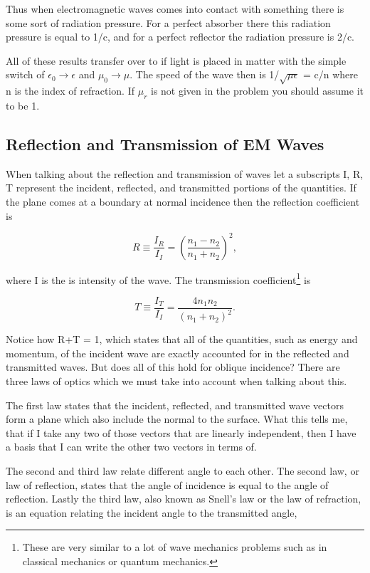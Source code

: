 \documentclass[preprint, review,12pt]{elsarticle}
\def\={\equiv}
\def\9{\left(}
\def\0{\right)}
\begin{document}
Thus when electromagnetic waves comes into contact with something there is some sort of radiation pressure. For a perfect absorber there this radiation pressure is equal to 1/c, and for a perfect reflector the radiation pressure is 2/c.

All of these results transfer over to if light is placed in matter with the simple switch of $\epsilon_0 \rightarrow \epsilon$ and $\mu_0 \rightarrow \mu.$ The speed of the wave then is 1/$\sqrt{\mu \epsilon}$ = c/n where n is the index of refraction. If $\mu_r$ is not given in the problem you should assume it to be 1.

\subsection{Reflection and Transmission of EM Waves}

When talking about the reflection and transmission of waves let a subscripts I, R, T represent the incident, reflected, and transmitted portions of the quantities. If the plane comes at a boundary at normal incidence then the reflection coefficient is 

\begin{equation}
    R \= \frac{I_R}{I_I} = \9 \frac{n_1 - n_2}{n_1+ n_2} \0 ^2,
\end{equation}

where I is the is intensity of the wave. The transmission coefficient\footnote{These are very similar to a lot of wave mechanics problems such as in classical mechanics or quantum mechanics.} is

\begin{equation}
    T \= \frac{I_T}{I_I} = \frac{4n_1n_2}{(n_1 + n_2)^2}.
\end{equation}

Notice how R+T = 1, which states that all of the quantities, such as energy and momentum, of the incident wave are exactly accounted for in the reflected and transmitted waves. But does all of this hold for oblique incidence? There are three laws of optics which we must take into account when talking about this.

The first law states that the incident, reflected, and transmitted wave vectors form a plane which also include the normal to the surface. What this tells me, that if I take any two of those vectors that are linearly independent, then I have a basis that I can write the other two vectors in terms of.

The second and third law relate different angle to each other. The second law, or law of reflection, states that the angle of incidence is equal to the angle of reflection. Lastly the third law, also known as Snell's law or the law of refraction, is an equation relating the incident angle to the transmitted angle,
\end{document}
